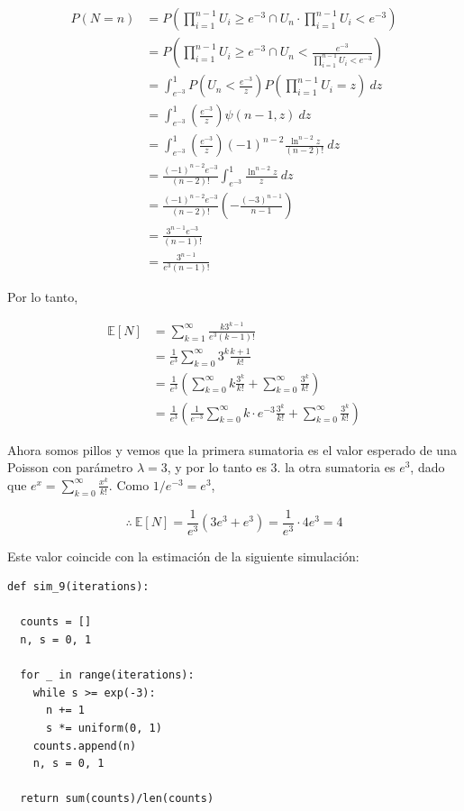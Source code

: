 \documentclass[a4paper, 12pt]{article}
\begin{document}
\begin{align*}
  P(N = n) 
  &= P \left( \prod_{i=1}^{n-1} U_i \geq e^{-3} \cap U_n \cdot \prod_{i=1}^{n-1}
  U_i < e^{-3}\right) \\ 
  &= P \left( \prod_{i=1}^{n-1} U_i \geq e^{-3} \cap U_n  < \frac{e^{-3}}{\prod_{i=1}^{n-1}U_i < e^{-3}}
    \right) \\ 
  &= \int_{e^{-3}}^1 P(U_n < \frac{e^{-3}}{z}) P\left( \prod_{i=1}^{n-1} U_i
  = z \right) ~ dz \\ 
  &=\int_{e^{-3}}^1 \left( \frac{e^{-3}}{z} \right) \psi(n-1, z) ~ dz \\ 
  &=\int_{e^{-3}}^1 \left( \frac{e^{-3}}{z} \right) (-1)^{n-2} 
  \frac{\ln^{n-2} z}{(n-2)!} ~ dz \\ 
  &= \frac{ (-1)^{n-2}e^{-3} }{(n-2)!}\int_{e^{-3}}^1
  \frac{ \ln^{n-2} z }{z} ~ dz \\ 
  &= \frac{ (-1)^{n-2}e^{-3} }{(n-2)!} \left( - \frac{(-3)^{n-1}}{n-1} \right)
  \\ 
  &= \frac{3^{n-1}e^{-3}}{(n-1)!} \\ 
  &= \frac{3^{n-1}}{e^3(n-1)!}
\end{align*}

Por lo tanto, 

\begin{align*}
  \mathbb{E}\left[ N \right] 
  &= \sum_{k=1}^\infty \frac{k 3^{k-1}}{e^{3}(k-1)!}\\
  &=\frac{1}{e^3} \sum_{k=0}^\infty 3^{k} \frac{k+1}{k!} \\
  &=\frac{1}{e^3}\left(\sum_{k=0}^\infty k \frac{3^k}{k!} + \sum_{k=0}^\infty
  \frac{3^k}{k!} \right) \\ 
  &=\frac{1}{e^3}\left(\frac{1}{e^{-3}}\sum_{k=0}^\infty k \cdot e^{-3} \frac{3^k}{k!} + \sum_{k=0}^\infty
  \frac{3^k}{k!} \right)
\end{align*}

Ahora somos pillos y vemos que la primera sumatoria es el valor
esperado de una Poisson con parámetro $\lambda = 3$, y por lo tanto es 
$3$. la otra sumatoria es $e^3$, dado que $e^x = \sum_{k=0}^\infty
\frac{x^k}{k!}$. Como $1 / e^{-3} = e^3$,

\begin{equation*}
  \therefore ~ \mathbb{E}\left[ N \right] = \frac{1}{e^3}(3e^3 + e^3) =
  \frac{1}{e^3} \cdot 4e^3 = 4
\end{equation*}

Este valor coincide con la estimación de la siguiente simulación:

\begin{verbatim}
def sim_9(iterations):

  counts = []
  n, s = 0, 1

  for _ in range(iterations):
    while s >= exp(-3):
      n += 1
      s *= uniform(0, 1)
    counts.append(n)
    n, s = 0, 1
 
  return sum(counts)/len(counts)
  
\end{verbatim}
\end{document}
